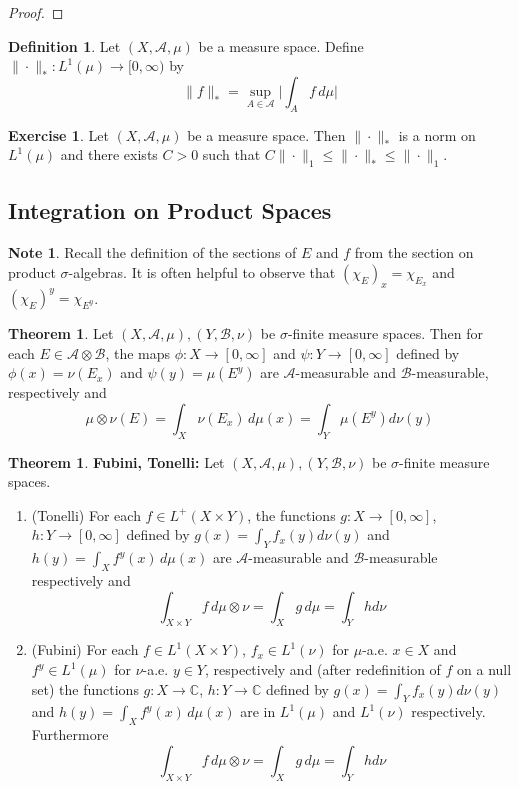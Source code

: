 \documentclass[12pt]{amsart}
\theoremstyle{definition}
\newtheorem{defn}[definition]{Definition}
\newtheorem{note}[definition]{Note}
\newtheorem{thm}[definition]{Theorem}
\newtheorem{ex}[definition]{Exercise}
\newcommand{\sig}{\sigma}
\newcommand{\C}{\mathbb{C}}
\newcommand{\MA}{\mathcal{A}}
\newcommand{\MB}{\mathcal{B}}
\newcommand{\dmu}{\, d \mu}
\newcommand{\RG}{[0,\infty]}
\newcommand{\Rg}{[0,\infty)}
\begin{document}
\begin{proof}
	\end{proof}
	
	\begin{defn}
	Let $(X, \MA, \mu)$ be a measure space. Define $\| \cdot \|_*: L^1(\mu) \rightarrow \Rg$ by  
	 $$\| f \|_* = \sup_{A \in \MA} \bigg | \int_A f \dmu \bigg |$$ 
	\end{defn}
	
	\begin{ex}
	Let $(X, \MA, \mu)$ be a measure space. Then $\| \cdot \|_*$ is a norm on $L^1(\mu)$ and there exists $C >0$ such that $C\|\cdot\|_1 \leq \|\cdot\|_* \leq \| \cdot \|_1$.
	\end{ex}
	
	
	
	
	
	
	
	
	
	
	\newpage
	\subsection{Integration on Product Spaces}
	
	\begin{note}
		Recall the definition of the sections of $E$ and $f$ from the section on product $\sigma$-algebras. It is often helpful to observe that $(\chi_E)_x = \chi_{E_x}$ and $(\chi_E)^y = \chi_{E^y}$.
	\end{note}
	
	\begin{thm}
		Let $(X,\MA, \mu), (Y, \MB, \nu)$ be $\sig$-finite measure spaces. Then for each $E \in \MA \otimes \MB$, the maps $\phi:X \rightarrow \RG$ and $\psi: Y \rightarrow \RG$ defined by $\phi(x) = \nu(E_x)$ and $\psi(y) = \mu(E^y)$ are $\MA$-measurable and $\MB$-measurable, respectively and $$\mu \otimes \nu(E) = \int_X \nu(E_x)\dmu(x) = \int_Y \mu(E^y)d\nu(y)$$ 
	\end{thm}
	
	\begin{thm}\textbf{Fubini, Tonelli:}
		Let $(X,\MA, \mu), (Y, \MB, \nu)$ be $\sig$-finite measure spaces. 
		
		\begin{enumerate}
			\item (Tonelli) For each $f \in L^+(X \times Y)$, the functions $g:X \rightarrow \RG$, $h:Y \rightarrow \RG$ defined by $g(x) = \int_Y f_x(y)d\nu(y)$ and $h(y) = \int_X f^y(x) \dmu(x)$ are $\MA$-measurable and $\MB$-measurable respectively and $$\int_{X \times Y}f \dmu \otimes \nu = \int_X g \dmu = \int_Y h d\nu$$
			
			\item (Fubini) For each $f \in L^1(X \times Y)$, $f_x \in L^1(\nu)$ for $\mu$-a.e. $x \in X$ and $f^y \in L^1(\mu)$ for $\nu$-a.e. $y \in Y$, respectively and (after redefinition of $f$ on a null set) the functions $g:X \rightarrow \C$, $h:Y \rightarrow \C$ defined by $g(x) = \int_Y f_x(y)d\nu(y)$ and $h(y) = \int_X f^y(x) \dmu(x)$ are in $L^1(\mu)$ and $L^1(\nu)$ respectively. Furthermore 
			$$\int_{X \times Y}f \, d \mu \otimes \nu = \int_X g \dmu = \int_Y h d\nu$$
		\end{enumerate}
	\end{thm}
	
\end{document}
